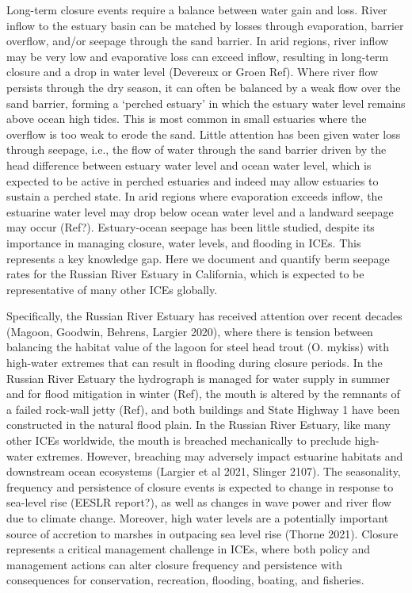 \documentclass[preprint,12pt,authoryear]{elsarticle}
\begin{document}
Long-term closure events require a balance between water gain and loss. River inflow to the estuary basin can be matched by losses through evaporation, barrier overflow, and/or seepage through the sand barrier. In arid regions, river inflow may be very low and evaporative loss can exceed inflow, resulting in long-term closure and a drop in water level (Devereux or Groen Ref). Where river flow persists through the dry season, it can often be balanced by a weak flow over the sand barrier, forming a `perched estuary' in which the estuary water level remains above ocean high tides. This is most common in small estuaries where the overflow is too weak to erode the sand. Little attention has been given water loss through seepage, i.e., the flow of water through the sand barrier driven by the head difference between estuary water level and ocean water level, which is expected to be active in perched estuaries and indeed may allow estuaries to sustain a perched state. In arid regions where evaporation exceeds inflow, the estuarine water level may drop below ocean water level and a landward seepage may occur (Ref?). Estuary-ocean seepage has been little studied, despite its importance in managing closure, water levels, and flooding in ICEs. This represents a key knowledge gap. Here we document and quantify berm seepage rates for the Russian River Estuary in California, which is expected to be representative of many other ICEs globally. 

 Specifically, the Russian River Estuary has received attention over recent decades (Magoon, Goodwin, Behrens, Largier 2020), where there is tension between balancing the habitat value of the lagoon for steel head trout (O. mykiss) with high-water extremes that can result in flooding during closure periods. In the Russian River Estuary the hydrograph is managed for water supply in summer and for flood mitigation in winter (Ref), the mouth is altered by the remnants of a failed rock-wall jetty (Ref), and both buildings and State Highway 1 have been constructed in the natural flood plain.
In the Russian River Estuary, like many other ICEs worldwide, the mouth is breached mechanically to preclude high-water extremes. However, breaching may adversely impact estuarine habitats and downstream ocean ecosystems (Largier et al 2021, Slinger 2107). The seasonality, frequency and persistence of closure events is expected to change in response to sea-level rise (EESLR report?), as well as changes in wave power and river flow due to climate change. Moreover, high water levels are a potentially important source of accretion to marshes in outpacing sea level rise (Thorne 2021). Closure represents a critical management challenge in ICEs, where both policy and management actions can alter closure frequency and persistence with consequences for conservation, recreation, flooding, boating, and fisheries. 
\end{document}
